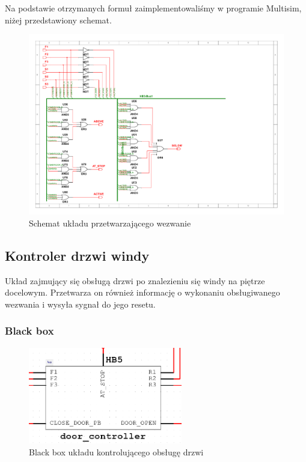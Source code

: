\documentclass[a4paper]{article}
\begin{document}
Na podstawie otrzymanych formuł zaimplementowaliśmy w programie Multisim,
niżej przedstawiony schemat.

\begin{figure}[H]
    \centering
    \includegraphics[width=\textwidth]{direction_controller_schemat.pdf}
    \caption{Schemat układu przetwarzającego wezwanie}
\end{figure}

\pagebreak
\subsection{Kontroler drzwi windy}

Układ zajmujący się obsługą drzwi po znalezieniu się windy na piętrze docelowym. 
Przetwarza on również informację o wykonaniu obsługiwanego wezwania
i wysyła sygnał do jego resetu.

\subsubsection{Black box}
\begin{figure}[H]
    \centering
    \includegraphics[width=0.6\textwidth]{door_controller.png}
    \caption{Black box układu kontrolującego obsługę drzwi}
\end{figure}
\end{document}
